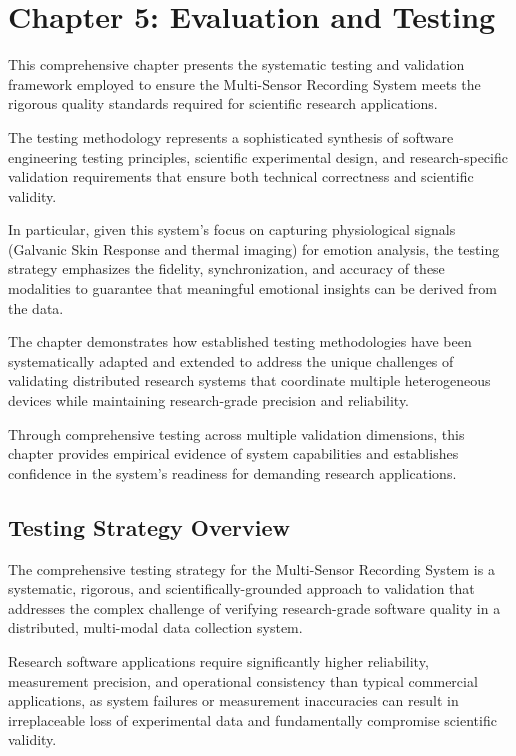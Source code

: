 \label{chap:5} \chapter{Chapter 5: Evaluation and Testing}

This comprehensive chapter presents the systematic testing and validation framework employed to ensure the Multi-Sensor Recording System meets the rigorous quality standards required for scientific research applications.

The testing methodology represents a sophisticated synthesis of software engineering testing principles, scientific experimental design, and research-specific validation requirements that ensure both technical correctness and scientific validity.

In particular, given this system's focus on capturing physiological signals (Galvanic Skin Response and thermal imaging) for emotion analysis, the testing strategy emphasizes the fidelity, synchronization, and accuracy of these modalities to guarantee that meaningful emotional insights can be derived from the data.

The chapter demonstrates how established testing methodologies have been systematically adapted and extended to address the unique challenges of validating distributed research systems that coordinate multiple heterogeneous devices while maintaining research-grade precision and reliability.

Through comprehensive testing across multiple validation dimensions, this chapter provides empirical evidence of system capabilities and establishes confidence in the system's readiness for demanding research applications.

\section{Testing Strategy Overview}

The comprehensive testing strategy for the Multi-Sensor Recording System is a systematic, rigorous, and scientifically-grounded approach to validation that addresses the complex challenge of verifying research-grade software quality in a distributed, multi-modal data collection system.

Research software applications require significantly higher reliability, measurement precision, and operational consistency than typical commercial applications, as system failures or measurement inaccuracies can result in irreplaceable loss of experimental data and fundamentally compromise scientific validity.

